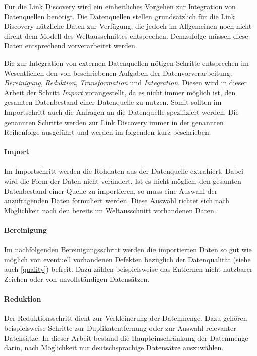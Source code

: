 Für die Link Discovery wird ein einheitliches Vorgehen zur Integration von Datenquellen benötigt. Die Datenquellen stellen grundsätzlich für die Link Discovery nützliche Daten zur Verfügung, die jedoch im Allgemeinen noch nicht direkt dem Modell des Weltausschnittes entsprechen. Demzufolge müssen diese Daten entsprechend vorverarbeitet werden.

Die zur Integration von externen Datenquellen nötigen Schritte entsprechen im Wesentlichen den von \textcite[S. 48f.]{hkp2012} beschriebenen Aufgaben der Datenvorverarbeitung: \emph{Bereinigung}, \emph{Reduktion}, \emph{Transformation} und \emph{Integration}. Diesen wird in dieser Arbeit der Schritt \emph{Import} vorangestellt, da es nicht immer möglich ist, den gesamten Datenbestand einer Datenquelle zu nutzen. Somit sollten im Importschritt auch die Anfragen an die Datenquelle spezifiziert werden. Die genannten Schritte werden zur Link Discovery immer in der genannten Reihenfolge ausgeführt und werden im folgenden kurz beschrieben.

\paragraph{Import}

Im Importschritt werden die Rohdaten aus der Datenquelle extrahiert. Dabei wird die Form der Daten nicht verändert. Ist es nicht möglich, den gesamten Datenbestand einer Quelle zu importieren, so muss eine Auswahl der anzufragenden Daten formuliert werden. Diese Auswahl richtet sich nach Möglichkeit nach den bereits im Weltausschnitt vorhandenen Daten.

\paragraph{Bereinigung}

Im nachfolgenden Bereinigungsschritt werden die importierten Daten so gut wie möglich von eventuell vorhandenen Defekten bezüglich der Datenqualität (siehe auch \ref{quality}) befreit. Dazu zählen beispielsweise das Entfernen nicht nutzbarer Zeichen oder von unvollständigen Datensätzen.

\paragraph{Reduktion}

Der Reduktionsschritt dient zur Verkleinerung der Datenmenge. Dazu gehören beispielsweise Schritte zur Duplikatentfernung oder zur Auswahl relevanter Datensätze. In dieser Arbeit bestand die Haupteinschränkung der Datenmenge darin, nach Möglichkeit nur deutschsprachige Datensätze auszuwählen.

